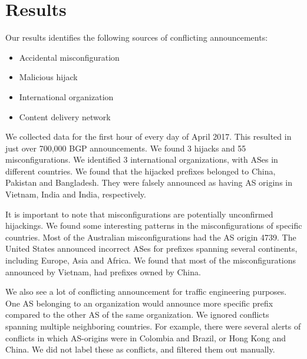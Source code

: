  \section{Results}\label{sec:results}
 
Our results identifies the following sources of conflicting announcements:
\begin{itemize}
\item Accidental misconfiguration
\item Malicious hijack
\item International organization
\item Content delivery network
\end{itemize}

We collected data for the first hour of every day of April 2017. This resulted in just over 700,000 BGP announcements. We found 3 hijacks and 55 misconfigurations. We identified 3 international organizations, with ASes in different countries. We found that the hijacked prefixes belonged to China, Pakistan and Bangladesh. They were falsely announced as having AS origins in Vietnam, India and India, respectively.

It is important to note that misconfigurations are potentially unconfirmed hijackings. We found some interesting patterns in the misconfigurations of specific countries. Most of the Australian misconfigurations had the AS origin 4739. The United States announced incorrect ASes for prefixes spanning several continents, including Europe, Asia and Africa. We found that most of the misconfigurations announced by Vietnam, had prefixes owned by China. 

We also see a lot of conflicting announcement for traffic engineering purposes. One AS belonging to an organization would announce more specific prefix compared to the other AS of the same organization. We ignored conflicts spanning multiple neighboring countries. For example, there were several alerts of conflicts in which AS-origins were in Colombia and Brazil, or Hong Kong and China. We did not label these as conflicts, and filtered them out manually.

